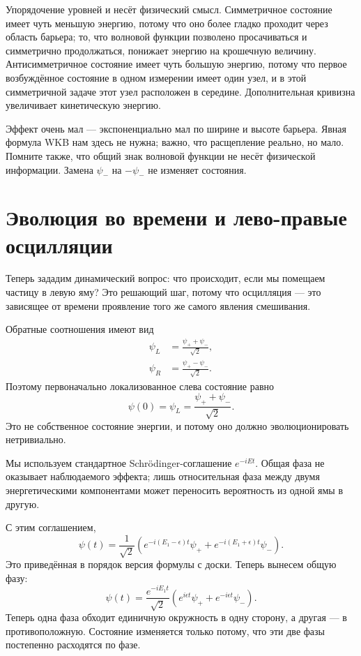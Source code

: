 Упорядочение уровней и несёт физический смысл. Симметричное состояние имеет чуть меньшую энергию, потому что оно более гладко проходит через область барьера; то, что волновой функции позволено просачиваться и симметрично продолжаться, понижает энергию на крошечную величину. Антисимметричное состояние имеет чуть большую энергию, потому что первое возбуждённое состояние в одном измерении имеет один узел, и в этой симметричной задаче этот узел расположен в середине. Дополнительная кривизна увеличивает кинетическую энергию.

Эффект очень мал — экспоненциально мал по ширине и высоте барьера. Явная формула WKB нам здесь не нужна; важно, что расщепление реально, но мало. Помните также, что общий знак волновой функции не несёт физической информации. Замена \(\psi_-\) на \(-\psi_-\) не изменяет состояния.

\section{Эволюция во времени и лево-правые осцилляции}

Теперь зададим динамический вопрос: что происходит, если мы помещаем частицу в левую яму? Это решающий шаг, потому что осцилляция — это зависящее от времени проявление того же самого явления смешивания.

Обратные соотношения имеют вид
\begin{align}
\psi_L &= \frac{\psi_+ + \psi_-}{\sqrt{2}},\\
\psi_R &= \frac{\psi_+ - \psi_-}{\sqrt{2}}.
\end{align}
Поэтому первоначально локализованное слева состояние равно
\begin{equation}
\psi(0)=\psi_L=\frac{\psi_+ + \psi_-}{\sqrt{2}}.
\end{equation}
Это не собственное состояние энергии, и потому оно должно эволюционировать нетривиально.

Мы используем стандартное Schr\"odinger-соглашение \(e^{-iEt}\). Общая фаза не оказывает наблюдаемого эффекта; лишь относительная фаза между двумя энергетическими компонентами может переносить вероятность из одной ямы в другую.

С этим соглашением,
\begin{equation}
\psi(t)=\frac{1}{\sqrt{2}}\left(e^{-i(E_1-\epsilon)t}\psi_+ + e^{-i(E_1+\epsilon)t}\psi_-\right).
\end{equation}
Это приведённая в порядок версия формулы с доски. Теперь вынесем общую фазу:
\begin{equation}
\psi(t)=\frac{e^{-iE_1 t}}{\sqrt{2}}\left(e^{i\epsilon t}\psi_+ + e^{-i\epsilon t}\psi_-\right).
\end{equation}
Теперь одна фаза обходит единичную окружность в одну сторону, а другая — в противоположную. Состояние изменяется только потому, что эти две фазы постепенно расходятся по фазе.

